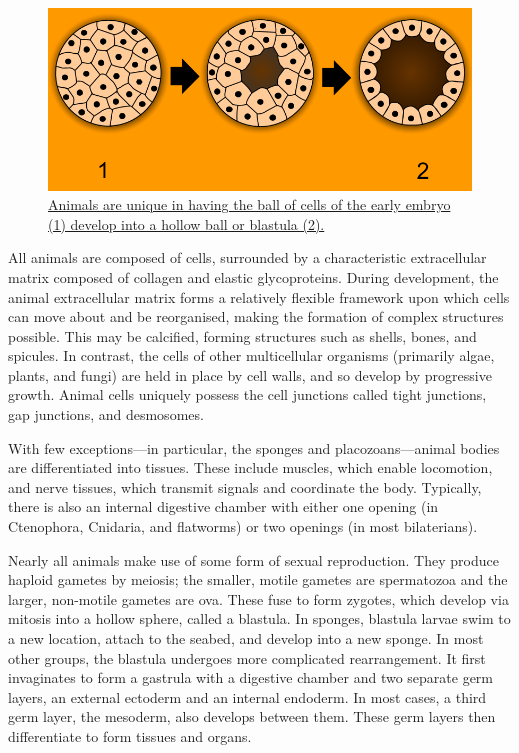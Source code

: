 \begin{figure}

{\centering \includegraphics[width=0.7\linewidth]{./figures/animals/Blastulation} 

}

\caption{\href{https://commons.wikimedia.org/wiki/File:Blastulation.png}{Animals are unique in having the ball of cells of the early embryo (1) develop into a hollow ball or blastula (2).}}\label{fig:animaldev}
\end{figure}

All animals are composed of cells, surrounded by a characteristic extracellular matrix composed of collagen and elastic glycoproteins. During development, the animal extracellular matrix forms a relatively flexible framework upon which cells can move about and be reorganised, making the formation of complex structures possible. This may be calcified, forming structures such as shells, bones, and spicules. In contrast, the cells of other multicellular organisms (primarily algae, plants, and fungi) are held in place by cell walls, and so develop by progressive growth. Animal cells uniquely possess the cell junctions called tight junctions, gap junctions, and desmosomes.

With few exceptions---in particular, the sponges and placozoans---animal bodies are differentiated into tissues. These include muscles, which enable locomotion, and nerve tissues, which transmit signals and coordinate the body. Typically, there is also an internal digestive chamber with either one opening (in Ctenophora, Cnidaria, and flatworms) or two openings (in most bilaterians).

Nearly all animals make use of some form of sexual reproduction. They produce haploid gametes by meiosis; the smaller, motile gametes are spermatozoa and the larger, non-motile gametes are ova. These fuse to form zygotes, which develop via mitosis into a hollow sphere, called a blastula. In sponges, blastula larvae swim to a new location, attach to the seabed, and develop into a new sponge. In most other groups, the blastula undergoes more complicated rearrangement. It first invaginates to form a gastrula with a digestive chamber and two separate germ layers, an external ectoderm and an internal endoderm. In most cases, a third germ layer, the mesoderm, also develops between them. These germ layers then differentiate to form tissues and organs.

